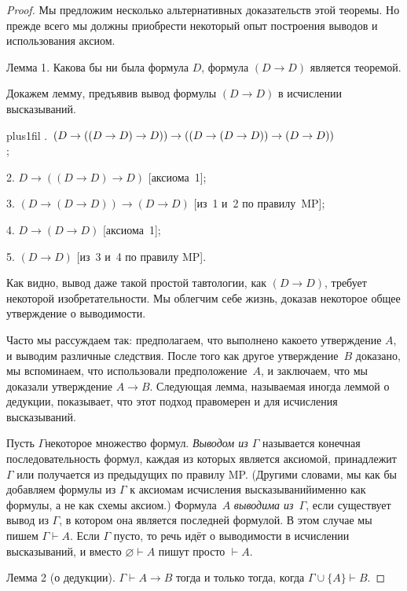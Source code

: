 \begin{proof}
Мы предложим несколько альтернативных доказательств этой
теоремы. Но прежде всего мы должны приобрести некоторый опыт
построения выводов и использования аксиом.

\textsf{Лемма 1}. Какова бы ни была формула $D$, формула ${(D\to
D)}$ является теоремой.

Докажем лемму, предъявив вывод формулы $(D\to D)$ в исчислении
высказываний.

{
\hangindent=4mm
\rightskip=0pt plus1fil
.~$({D\to((D\to D)\to D))}\hm\to{((D\to(D \to D))\to(D\to D))}$\\\relax
[аксиома~2 при $A=D$, $B=(D\to D)$, $C=D$];

\raggedright
2. $D\to((D\to D)\to D)$ [аксиома~1];

3. $(D\to(D\to D))\to(D\to D)$ [из~1 и~2 по правилу~MP];

4. $D\to(D\to D)$ [аксиома~1];

5. $(D\to D)$ [из~3 и~4 по правилу MP].
}

\medskip

Как видно, вывод даже такой простой тавтологии, как $(D\to D)$,
требует некоторой изобретательности. Мы облегчим себе жизнь,
доказав некоторое общее утверждение о выводимости.

Часто мы рассуждаем так: предполагаем, что выполнено какое\д то
утверждение $A$, и выводим различные следствия. После того как
другое утверждение~$B$ доказано, мы вспоминаем, что использовали
предположение~$A$, и заключаем, что мы доказали утверждение
$A\to B$. Следующая лемма, называемая иногда  леммой о
дедукции, показывает, что этот подход правомерен и для
исчисления высказываний.

Пусть $\Gamma$\т некоторое множество формул. \emph{Выводом из
$\Gamma$}%
называется конечная последовательность формул, каждая
из которых является аксиомой, принадлежит $\Gamma$ или
получается из предыдущих по правилу MP. (Другими словами, мы как
бы добавляем формулы из $\Gamma$ к аксиомам исчисления
высказываний\т именно как формулы, а не как схемы аксиом.)
Формула~$A$ \emph{выводима из}~$\Gamma$,%
если существует вывод
из $\Gamma$, в котором она является последней формулой. В этом
случае мы пишем $\Gamma\vdash A$. Если $\Gamma$ пусто, то речь
идёт о выводимости в исчислении высказываний, и вместо
$\varnothing\vdash A$ пишут просто $\vdash A$.

        \label{deduction-lemma}%
\textsf{Лемма 2 (о дедукции)}.%
$\Gamma\vdash A\to B$ тогда и только тогда, когда
$\Gamma\cup\{A\}\vdash B$.


\end{proof}
